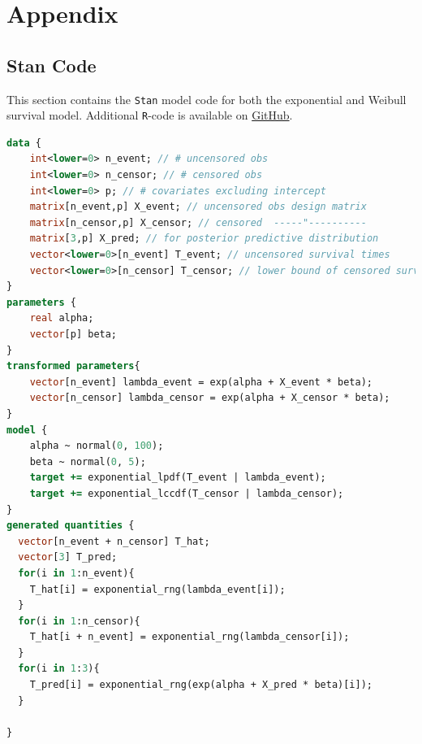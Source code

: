 \section{Appendix}

\setcounter{table}{0}
\renewcommand{\thetable}{A\arabic{table}}
\setcounter{figure}{0}
\renewcommand{\thefigure}{A\arabic{figure}}


\subsection{Stan Code}
This section contains the \texttt{Stan} model code for both the exponential and Weibull survival model. Additional \texttt{R}-code is available on \href{https://github.com/pitrieger/BayesianStats_FinalProject}{GitHub}.

\begin{lstlisting}[language=Stan, caption = {Exponential Survival Model}, captionpos = t, label = {code:stan_exp}]
data {
    int<lower=0> n_event; // # uncensored obs                                     
    int<lower=0> n_censor; // # censored obs                                    
    int<lower=0> p; // # covariates excluding intercept                                        
    matrix[n_event,p] X_event; // uncensored obs design matrix                           
    matrix[n_censor,p] X_censor; // censored  -----"---------- 
    matrix[3,p] X_pred; // for posterior predictive distribution
    vector<lower=0>[n_event] T_event; // uncensored survival times                         
    vector<lower=0>[n_censor] T_censor; // lower bound of censored survival times = censor time                  
}
parameters {
    real alpha;
    vector[p] beta;                                     
}
transformed parameters{
    vector[n_event] lambda_event = exp(alpha + X_event * beta);
    vector[n_censor] lambda_censor = exp(alpha + X_censor * beta);
}
model {
    alpha ~ normal(0, 100);
    beta ~ normal(0, 5);
    target += exponential_lpdf(T_event | lambda_event); 
    target += exponential_lccdf(T_censor | lambda_censor);  
}
generated quantities {
  vector[n_event + n_censor] T_hat;
  vector[3] T_pred;
  for(i in 1:n_event){
    T_hat[i] = exponential_rng(lambda_event[i]);
  }
  for(i in 1:n_censor){
    T_hat[i + n_event] = exponential_rng(lambda_censor[i]);
  }
  for(i in 1:3){
    T_pred[i] = exponential_rng(exp(alpha + X_pred * beta)[i]);
  }
  
}
\end{lstlisting}

\clearpage

